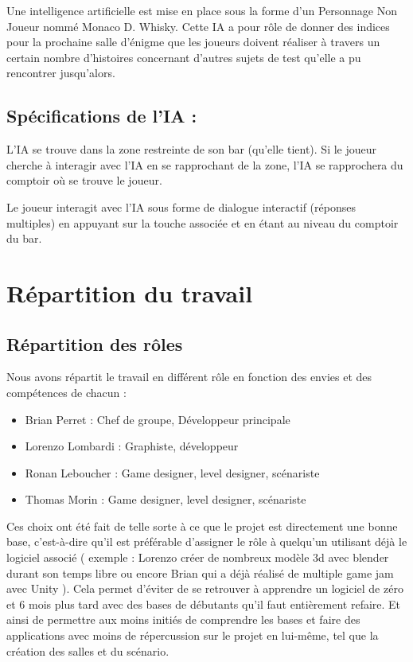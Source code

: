 \documentclass[a4paper,11pt]{article}
\begin{document}
Une intelligence artificielle est mise en place sous la 
forme d’un Personnage Non Joueur nommé Monaco D. Whisky. 
Cette IA a pour rôle de donner des indices pour la prochaine salle d’énigme que les 
joueurs doivent réaliser à travers un certain nombre d’histoires concernant d’autres sujets de 
test qu’elle a pu rencontrer jusqu’alors.


\subsection{Spécifications de l’IA :}

L’IA se trouve dans la zone restreinte de son bar (qu’elle tient). Si le joueur cherche à 
interagir avec l’IA en se rapprochant de la zone, l’IA se rapprochera du comptoir où se trouve le joueur.\newline


Le joueur interagit avec l’IA sous forme de dialogue interactif (réponses multiples) 
en appuyant sur la touche associée et en étant au niveau du comptoir du bar.


\section{Répartition du travail}

\subsection{Répartition des rôles}

Nous avons répartit le travail en différent rôle en fonction des envies 
et des compétences de chacun :\newline

\begin{itemize}
    \item Brian Perret : Chef de groupe, Développeur principale 
    \item Lorenzo Lombardi : Graphiste, développeur
    \item Ronan Leboucher : Game designer, level designer, scénariste
    \item Thomas Morin : Game designer, level designer, scénariste\newline
\end{itemize}

Ces choix ont été fait de telle sorte à ce que le projet est directement une bonne base, 
c’est-à-dire qu’il est préférable d’assigner le rôle à quelqu'un utilisant déjà le logiciel 
associé ( exemple : Lorenzo créer de nombreux modèle 3d avec blender durant son temps libre ou encore
 Brian qui a déjà réalisé de multiple game jam avec Unity ). Cela permet d'éviter de se retrouver à 
 apprendre un logiciel de zéro et 6 mois plus tard avec des bases de débutants qu’il faut entièrement refaire.
Et ainsi de permettre aux moins initiés de comprendre les bases et faire des applications avec 
moins de répercussion sur le projet en lui-même, tel que la création des salles et du scénario.
\end{document}
